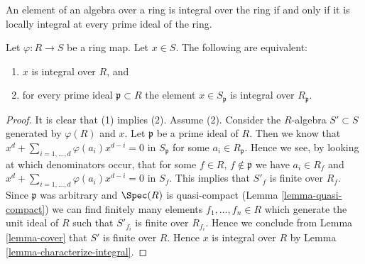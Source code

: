\begin{lemma}
\label{lemma-integral-closure-stalks}
\begin{slogan}
An element of an algebra over a ring is integral over the ring
if and only if it is locally integral at every prime ideal of the ring.
\end{slogan}
Let $\varphi : R \to S$ be a ring map.
Let $x \in S$. The following are equivalent:
\begin{enumerate}
\item $x$ is integral over $R$, and
\item for every prime ideal $\mathfrak p \subset R$ the element
$x \in S_{\mathfrak p}$ is integral over $R_{\mathfrak p}$.
\end{enumerate}
\end{lemma}

\begin{proof}
It is clear that (1) implies (2). Assume (2). Consider the $R$-algebra
$S' \subset S$ generated by $\varphi(R)$ and $x$. Let $\mathfrak p$ be
a prime ideal of $R$. Then we know that
$x^d + \sum_{i = 1, \ldots, d} \varphi(a_i) x^{d - i} = 0$
in $S_{\mathfrak p}$ for some $a_i \in R_{\mathfrak p}$. Hence we see,
by looking at which denominators occur, that
for some $f \in R$, $f \not \in \mathfrak p$ we have
$a_i \in R_f$ and
$x^d + \sum_{i = 1, \ldots, d} \varphi(a_i) x^{d - i} = 0$
in $S_f$. This implies that $S'_f$ is finite over $R_f$.
Since $\mathfrak p$ was arbitrary and $\Spec(R)$ is quasi-compact
(Lemma \ref{lemma-quasi-compact}) we can find finitely many elements
$f_1, \ldots, f_n \in R$
which generate the unit ideal of $R$ such that $S'_{f_i}$ is finite
over $R_{f_i}$. Hence we conclude from Lemma \ref{lemma-cover} that
$S'$ is finite over $R$. Hence $x$ is integral over $R$ by
Lemma \ref{lemma-characterize-integral}.
\end{proof}